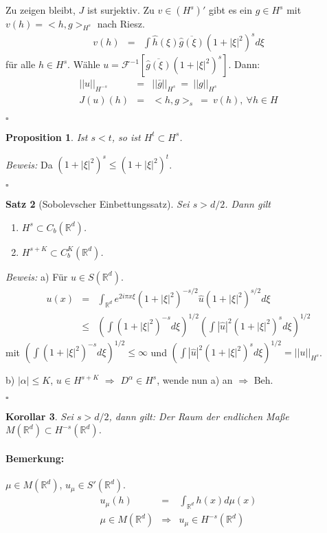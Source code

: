 \documentclass[11pt,a4paper,titlepage, ngerman]{scrartcl}
\newtheorem{Satz}{Satz}[section]
\newtheorem{Prop}[Satz]{Proposition}
\newtheorem{Korollar}[Satz]{Korollar}
\numberwithin{equation}{section}
\newcommand{\R}{\mathbb{R}} %
\newcommand{\g}{\hat{g}}
\newcommand{\F}{\mathcal{F}}
\newcommand{\Bew}{\emph{Beweis: }}
\newcommand{\qed}{\begin{flushright}
		$\square$
	\end{flushright}}
\begin{document}
	Zu zeigen bleibt, $J$ ist surjektiv. Zu $v\in(H^s)'$ gibt es ein $g\in H^s$ mit $v(h) = <h,g>_{H^s}$ nach Riesz.
	\begin{eqnarray}
		v(h) &=& \int \hat h(\xi)\overline{\g(\xi)} (1+|\xi|^2)^s d\xi\nonumber
	\end{eqnarray}
	für alle $h\in H^s$. Wähle $u=\F^{-1}[\overline{\g(\xi)}(1+|\xi|^2)^{s}]$. Dann:
	\begin{eqnarray}
		||u||_{H^{-s}} &=& ||\bar g||_{H^s} ~=~ ||g||_{H^s}\nonumber\\
		J(u)(h) &=& <h,g>_{s}~=~ v(h),~\forall h\in H\nonumber
	\end{eqnarray}
	\qed
	
	\begin{Prop}
		Ist $s<t$, so ist $H^t\subset H^s$.
	\end{Prop}
	
	\Bew Da $(1+|\xi|^2)^s\leq (1+|\xi|^2)^t$.
	\qed
	
	\begin{Satz}[Sobolevscher Einbettungssatz]
		Sei $s>d/2$. Dann gilt
		\begin{enumerate}
			\item[a)] $H^s\subset C_b(\R^d)$.
			\item[b)] $H^{s+K}\subset C_b^K(\R^d)$.
		\end{enumerate}
	\end{Satz}
	
	\Bew a) Für $u\in S(\R^d)$. 
	\begin{eqnarray}
		u(x) &=& \int_{\R^d} e^{2i\pi x\xi}(1+|\xi|^2)^{-s/2} \hat u(1+|\xi|^2)^{s/2} d\xi\nonumber\\
		&\leq& \left(\int (1+|\xi|^2)^{-s}d\xi \right)^{1/2} \left(\int |\hat u|^2 (1+|\xi|^2)^sd\xi \right)^{1/2}\nonumber 
	\end{eqnarray}
	mit $\left(\int (1+|\xi|^2)^{-s}d\xi \right)^{1/2}\leq \infty$ und $\left(\int |\hat u|^2 (1+|\xi|^2)^sd\xi \right)^{1/2} = ||u||_{H^s}$. 
	
	b) $|\alpha|\leq K$, $u\in H^{s+K}$ $\Rightarrow$ $D^\alpha\in H^s$, wende nun a) an $\Rightarrow$ Beh.
	\qed
	
	\begin{Korollar}
		Sei $s>d/2$, dann gilt: Der Raum der endlichen Maße $M(\R^d)\subset H^{-s}(\R^d)$.
	\end{Korollar}
	
	\paragraph{Bemerkung:} $\mu\in M(\R^d)$, $u_\mu\in S'(\R^d)$.
	\begin{eqnarray}
		u_\mu(h) &=& \int_{\R^d}h(x)d\mu(x)\nonumber\\
		\mu\in M(\R^d) &\Rightarrow& u_\mu \in H^{-s}(\R^d)\nonumber
	\end{eqnarray}
	
\end{document}
